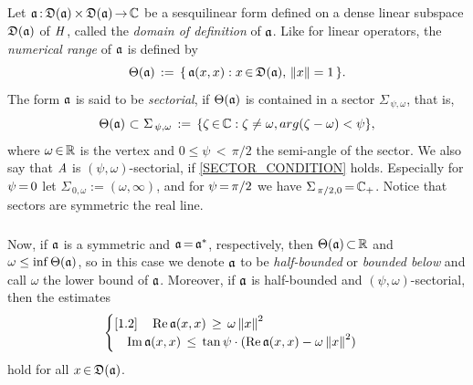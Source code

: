 \documentclass[11pt,twoside]{article}
\begin{document}
\subparagraph{} %
Let $\mathfrak{a} {\,:\,} \mathfrak{D}(\mathfrak{a}) {\,\times\,} \mathfrak{D}(\mathfrak{a}) {\,\to\,} {\mathbb{C}}$
be a sesquilinear form
defined on a dense linear subspace $\mathfrak{D}(\mathfrak{a})$ of $\mathit{H}$,
called the \textit{domain of definition} of $\mathfrak{a}$.
Like for linear operators,
the \textit{numerical range} of $\mathfrak{a}$ is defined by
\[
\Theta(\mathfrak{a}) \,:=\,
\{\, \mathfrak{a}(x,x): x {\,\in\,} \mathfrak{D}(\mathfrak{a}), \, \left\lVert x \right\rVert=1 \,\}.
\]
The form $\mathfrak{a}$ is said to be \textit{sectorial},
if $\Theta(\mathfrak{a})$ is contained in a sector $\Sigma_{\,\psi,\omega}$,
that is,
\begin{equation}\label{SECTOR_CONDITION}
\Theta(\mathfrak{a}) \, {\,\subset\,} \,
\Sigma_{\,\psi,\omega} \,:=\,
\{\zeta {\,\in\,} {\mathbb{C}}: \zeta \neq \omega, arg(\zeta-\omega) < \psi \},
\end{equation}
where $\omega {\,\in\,} {\mathbb{R}}$ is the vertex
and $0 \leq \psi {\,<\,} \pi/2$ the semi-angle of the sector.
We also say that $\mathit{A}$ is $(\psi,\omega)$-sectorial,
if \eqref{SECTOR_CONDITION} holds.
Especially for $\psi {\,=\,} 0$ let $\Sigma_{\,0,\omega} := (\omega,\infty)$,
and for $\psi {\,=\,} \pi/2$ we have $\Sigma_{\,\pi/2,0} {\,=\,} {\mathbb{C}}_+$.
Notice that sectors are symmetric {\wrt} the real line.

\subparagraph{} %
Now,
if $\mathfrak{a}$ is a symmetric and $\mathfrak{a} {\,=\,} \mathfrak{a}^*$,
respectively,
then $\Theta(\mathfrak{a}) {\,\subset\,} {\mathbb{R}}$ and $\omega \leq \inf \Theta(\mathfrak{a})$, 
so in this case we denote $\mathfrak{a}$ to be 
\textit{half-bounded} or \textit{bounded below}
and call $\omega$ the lower bound of $\mathfrak{a}$.
Moreover,
if $\mathfrak{a}$ is half-bounded and $(\psi,\omega)$-sectorial,
then the estimates
\[
\begin{cases}[1.2]
\quad \operatorname{Re} \mathfrak{a}(x,x) \, \geq \, \omega \left\lVert x \right\rVert^2 \\
\quad \operatorname{Im} \mathfrak{a}(x,x) \, \leq \,
      \tan \psi \cdot (\operatorname{Re} \mathfrak{a}(x,x) - \omega \left\lVert x \right\rVert^2)\\
\end{cases}
\]
hold for all $x {\,\in\,} \mathfrak{D}(\mathfrak{a})$.
\end{document}
